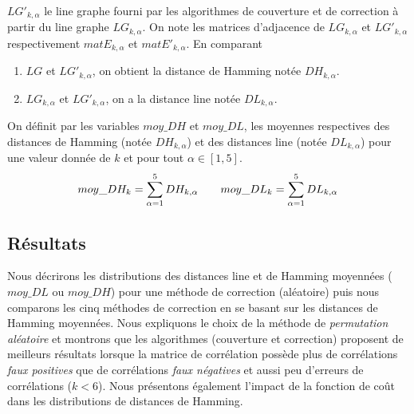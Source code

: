  $LG'_{k, \alpha}$  le line graphe fourni par les algorithmes de couverture et de correction \`a partir du line graphe $LG_{k, \alpha}$.
 \newline
 On note les matrices d'adjacence de $LG_{k, \alpha}$ et $LG'_{k, \alpha}$ respectivement $matE_{k, \alpha}$ et $matE'_{k, \alpha}$.
\newline
En comparant
\begin{enumerate}
\item  $LG$ et $LG'_{k, \alpha}$, on obtient la distance de Hamming not\'ee $DH_{k,\alpha}$.
\item $LG_{k,\alpha}$ et $LG'_{k,\alpha}$, on a la distance line not\'ee $DL_{k,\alpha}$.
\end{enumerate}
On d\'efinit par les variables $moy\_DH$ et $moy\_DL$, les moyennes respectives des distances de Hamming (not\'ee $DH_{k,\alpha}$) et des distances line (not\'ee $DL_{k,\alpha}$) pour une valeur donn\'ee de $k$ et pour tout $\alpha \in [1, 5]$.
\begin{equation}
moy\_DH_k = \sum_{\alpha = 1}^{5} DH_{k, \alpha} \hspace{2 em}
moy\_DL_k = \sum_{\alpha = 1}^{5} DL_{k, \alpha}
\end{equation}

  
\subsection{R\'esultats}
Nous d\'ecrirons les distributions des distances line et de Hamming moyenn\'ees ($moy\_DL$ ou $moy\_DH$) pour une m\'ethode de correction (al\'eatoire) puis nous comparons les cinq m\'ethodes de correction en se basant sur les distances de Hamming moyenn\'ees. 
Nous expliquons le choix de la m\'ethode de {\em permutation al\'eatoire} et montrons que les algorithmes (couverture et correction) proposent de meilleurs r\'esultats lorsque la matrice de corr\'elation poss\`ede plus de corr\'elations {\em faux positives} que de corr\'elations {\em faux n\'egatives} et aussi peu d'erreurs de corr\'elations ($k < 6$). 
\newline
Nous pr\'esentons \'egalement l'impact de la fonction de co\^ut dans les distributions  de distances de Hamming.

